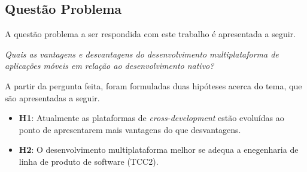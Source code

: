 \subsection{Questão Problema} \label{sec:questaoproblema}

A questão problema a ser respondida com este trabalho é apresentada a seguir.

\begin{center}
    \textit{Quais as vantagens e desvantagens do desenvolvimento multiplataforma de aplicações móveis em relação ao desenvolvimento nativo?}
\end{center}

A partir da pergunta feita, foram formuladas duas hipóteses acerca do tema, que são apresentadas a seguir.

\begin{itemize}
    \item \textbf{H1}: Atualmente as plataformas de \textit{cross-development} estão evoluídas ao ponto de apresentarem mais vantagens do que desvantagens.
    \item \textbf{H2}: O desenvolvimento multiplataforma melhor se adequa a enegenharia de linha de produto de software (TCC2).
\end{itemize}


